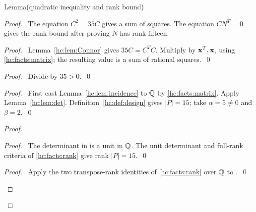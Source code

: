 \begin{mergedproofsection}
\begin{namedresult}{Lemma}{(quadratic inequality and rank bound)}\label{hc:lem:rank}
 \leavevmode\par
\end{namedresult}
\begin{proof}
 \pfsketch\ The equation $C^2=35C$ gives a sum of squares. The
 equation $CN^T=0$ gives the rank bound after proving $N$ has rank fifteen.
 \begin{proof}\pf\ Lemma~\ref{hc:lem:Connor} gives $35C=C^TC$.
  Multiply by ${\mathbf x}^T,{\mathbf x}$, using \ref{hc:facts:matrix}; the resulting
  value is a sum of rational squares.~\qed\end{proof}
 \begin{proof}\pf\ Divide  by $35>0$.~\qed\end{proof}
 \begin{proof}\pf\ First cast Lemma~\ref{hc:lem:incidence} to ${\mathbb Q}$
  by \ref{hc:facts:matrix}. Apply Lemma~\ref{hc:lem:det}.
  Definition~\ref{hc:def:design} gives
  $|P|=15$; take $\alpha=5\ne0$ and $\beta=2$.~\qed\end{proof}
 \begin{proof}
  \begin{proof}\pf\ The determinant in  is a
   unit in ${\mathbb Q}$. The unit determinant and full-rank criteria of
   \ref{hc:facts:rank} give rank $|P|=15$.~\qed\end{proof}
  \qedstep
  \begin{proof}\pf\ Apply the two transpose-rank identities of
   \ref{hc:facts:rank} over ${\mathbb Q}$ to .~\qed\end{proof}

\end{proof}
\end{proof}
\end{mergedproofsection}
